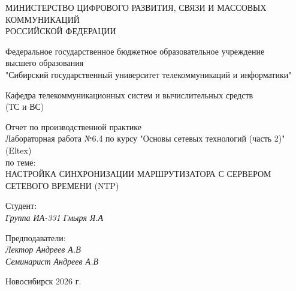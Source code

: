 \thispagestyle{empty}

\begin{center}
    МИНИСТЕРСТВО ЦИФРОВОГО РАЗВИТИЯ, СВЯЗИ И МАССОВЫХ КОММУНИКАЦИЙ \\ РОССИЙСКОЙ ФЕДЕРАЦИИ

    \vspace{20pt}

    Федеральное государственное бюджетное образовательное учреждение  \\  высшего образования \\
    "Сибирский государственный университет телекоммуникаций и информатики" \\

    \vspace{20pt}

    Кафедра телекоммуникационных систем и вычислительных средств \\  (ТС и ВС)
\end{center}

\vfill

\begin{center}
    Отчет по производственной практике \\  
    Лабораторная работа №6.4 по курсу "Основы сетевых технологий (часть 2)" (Eltex) \\
    \vspace{20pt}
    по теме: \\
    \uppercase{Настройка синхронизации маршрутизатора с сервером сетевого времени (NTP)}
\end{center}

\vfill

    \noindent Студент: \\
    \textit{Группа ИА-331 \hfill Гмыря Я.А} 

    \vspace{20pt}
 
    \noindent Предподаватели: \\
    \textit{Лектор \hfill Андреев А.В} \\
    \textit{Семинарист \hfill Андреев А.В}

\vfill

\begin{center}
    Новосибирск 2026 г.
\end{center}